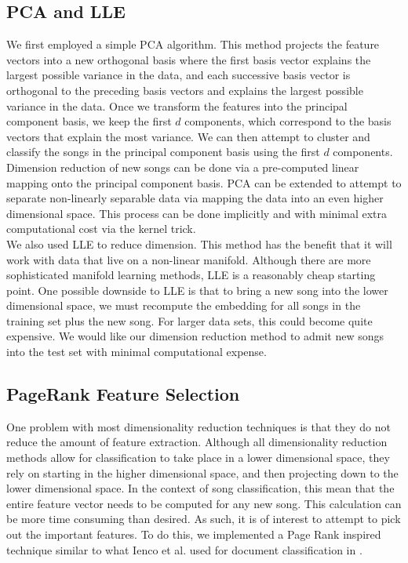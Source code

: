 \documentclass[12pt]{article}
\begin{document}
\subsection{PCA and LLE}
We first employed a simple PCA algorithm.  This method projects the feature vectors into a new orthogonal basis where the first basis vector explains the largest possible variance in the data, and each successive basis vector is orthogonal to the preceding basis vectors and explains the largest possible variance in the data.  Once we transform the features into the principal component basis, we keep the first $d$ components, which correspond to the basis vectors that explain the most variance.  We can then attempt to cluster and classify the songs in the principal component basis using the first $d$ components.  Dimension reduction of new songs can be done via a pre-computed linear mapping onto the principal component basis.  PCA can be extended to attempt to separate non-linearly separable data via mapping the data into an even higher dimensional space.  This process can be done implicitly and with minimal extra computational cost via the kernel trick.\\


We also used LLE to reduce dimension.  This method has the benefit that it will work with data that live on a non-linear manifold.  Although there are more sophisticated manifold learning methods, LLE is a reasonably cheap starting point.  One possible downside to LLE is that to bring a new song into the lower dimensional space, we must recompute the embedding for all songs in the training set plus the new song.  For larger data sets, this could become quite expensive.  We would like our dimension reduction method to admit new songs into the test set with minimal computational expense.\\

\subsection{PageRank Feature Selection}
One problem with most dimensionality reduction techniques is that they do not reduce the amount of feature extraction.  Although all dimensionality reduction methods allow for classification to take place in a lower dimensional space, they rely on starting in the higher dimensional space, and then projecting down to the lower dimensional space.  In the context of song classification, this mean that the entire feature vector needs to be computed for any new song.  This calculation can be more time consuming than desired.  As such, it is of interest to attempt to pick out the important features.  To do this, we implemented a Page Rank inspired technique similar to what Ienco et al. used for document classification in \cite{ieonco:pagerank}.
\end{document}
